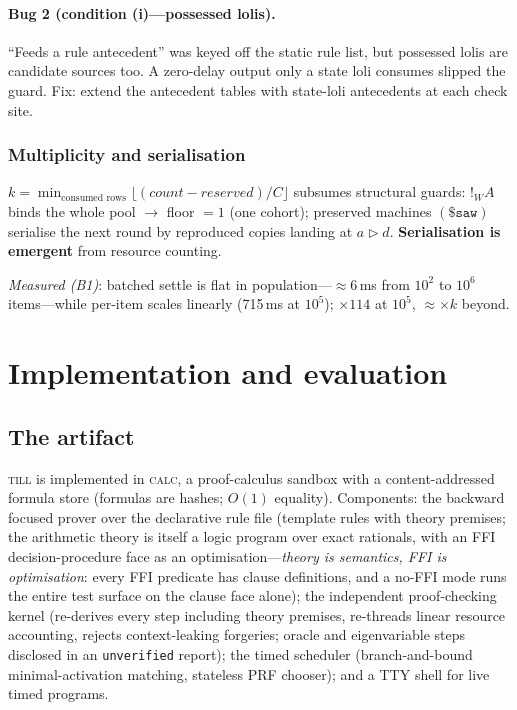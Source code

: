 \documentclass[11pt]{article}
\newcommand{\gbang}[1]{{!}_{#1}}                 %
\newcommand{\act}{\mathbin{\rhd}}                %
\newcommand{\till}{\textsc{till}}                %
\newcommand{\calc}{\textsc{calc}}               %
\theoremstyle{definition}
\theoremstyle{remark}
\begin{document}
\paragraph{Bug 2 (condition (i)---possessed lolis).} ``Feeds a rule antecedent''
was keyed off the static rule list, but possessed lolis are candidate sources too.
A zero-delay output only a state loli consumes slipped the guard.  Fix: extend the
antecedent tables with state-loli antecedents at each check site.

\subsubsection*{Multiplicity and serialisation}

$k = \min_{\text{consumed rows}} \lfloor(\mathit{count} - \mathit{reserved})/C\rfloor$
subsumes structural guards: $\gbang{W} A$ binds the whole pool $\to$ floor $= 1$
(one cohort); preserved machines $(\$\mathtt{saw})$ serialise the next round by
reproduced copies landing at $a \act d$.  \textbf{Serialisation is emergent} from
resource counting.

\textit{Measured (B1)}: batched settle is flat in population---$\approx 6$\,ms
from $10^2$ to $10^6$ items---while per-item scales linearly (715\,ms at $10^5$);
$\times 114$ at $10^5$, $\approx \times k$ beyond.

\section{Implementation and evaluation}
\label{sec:eval}

\subsection{The artifact}

\till{} is implemented in \calc{}, a proof-calculus sandbox with a
content-addressed formula store (formulas are hashes; $O(1)$ equality).
Components: the backward focused prover over the declarative rule file (template
rules with theory premises; the arithmetic theory is itself a logic program over
exact rationals, with an FFI decision-procedure face as an optimisation---\emph{theory
is semantics, FFI is optimisation}: every FFI predicate has clause definitions, and
a no-FFI mode runs the entire test surface on the clause face alone); the
independent proof-checking kernel (re-derives every step including theory premises,
re-threads linear resource accounting, rejects context-leaking forgeries; oracle
and eigenvariable steps disclosed in an \texttt{unverified} report); the timed
scheduler (branch-and-bound minimal-activation matching, stateless PRF chooser);
and a TTY shell for live timed programs.
\end{document}
